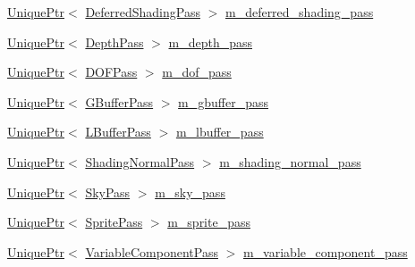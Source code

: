 \begin{DoxyCompactItemize}
\item 
\hyperlink{namespacemage_a3316d7143a973e37adf1110f2e80ca31}{Unique\+Ptr}$<$ \hyperlink{classmage_1_1_deferred_shading_pass}{Deferred\+Shading\+Pass} $>$ \hyperlink{classmage_1_1_renderer_a0179c9a4fe8b2c6d090a96adc94383b0}{m\+\_\+deferred\+\_\+shading\+\_\+pass}
\item 
\hyperlink{namespacemage_a3316d7143a973e37adf1110f2e80ca31}{Unique\+Ptr}$<$ \hyperlink{classmage_1_1_depth_pass}{Depth\+Pass} $>$ \hyperlink{classmage_1_1_renderer_a8c0dc117b4df9685e9e049175e5a91a6}{m\+\_\+depth\+\_\+pass}
\item 
\hyperlink{namespacemage_a3316d7143a973e37adf1110f2e80ca31}{Unique\+Ptr}$<$ \hyperlink{classmage_1_1_d_o_f_pass}{D\+O\+F\+Pass} $>$ \hyperlink{classmage_1_1_renderer_aa0c9add6ebb5bf1ace9592c6041bf5a8}{m\+\_\+dof\+\_\+pass}
\item 
\hyperlink{namespacemage_a3316d7143a973e37adf1110f2e80ca31}{Unique\+Ptr}$<$ \hyperlink{classmage_1_1_g_buffer_pass}{G\+Buffer\+Pass} $>$ \hyperlink{classmage_1_1_renderer_a7f36e74990c2c32d7fa26cdc00f86009}{m\+\_\+gbuffer\+\_\+pass}
\item 
\hyperlink{namespacemage_a3316d7143a973e37adf1110f2e80ca31}{Unique\+Ptr}$<$ \hyperlink{classmage_1_1_l_buffer_pass}{L\+Buffer\+Pass} $>$ \hyperlink{classmage_1_1_renderer_a7f60c763f2636bd1ea608b69a5924996}{m\+\_\+lbuffer\+\_\+pass}
\item 
\hyperlink{namespacemage_a3316d7143a973e37adf1110f2e80ca31}{Unique\+Ptr}$<$ \hyperlink{classmage_1_1_shading_normal_pass}{Shading\+Normal\+Pass} $>$ \hyperlink{classmage_1_1_renderer_a1867f2dd151f3180b8efebba5b018fc8}{m\+\_\+shading\+\_\+normal\+\_\+pass}
\item 
\hyperlink{namespacemage_a3316d7143a973e37adf1110f2e80ca31}{Unique\+Ptr}$<$ \hyperlink{classmage_1_1_sky_pass}{Sky\+Pass} $>$ \hyperlink{classmage_1_1_renderer_a7e9d76a3294d0a5b2d99a5335ff0cd04}{m\+\_\+sky\+\_\+pass}
\item 
\hyperlink{namespacemage_a3316d7143a973e37adf1110f2e80ca31}{Unique\+Ptr}$<$ \hyperlink{classmage_1_1_sprite_pass}{Sprite\+Pass} $>$ \hyperlink{classmage_1_1_renderer_ae6850abe92b8d03f3eefbfb34fe9e5d8}{m\+\_\+sprite\+\_\+pass}
\item 
\hyperlink{namespacemage_a3316d7143a973e37adf1110f2e80ca31}{Unique\+Ptr}$<$ \hyperlink{classmage_1_1_variable_component_pass}{Variable\+Component\+Pass} $>$ \hyperlink{classmage_1_1_renderer_a6016e73941650d3b88ef9ab9873548a6}{m\+\_\+variable\+\_\+component\+\_\+pass}
\item 

\end{DoxyCompactItemize}

